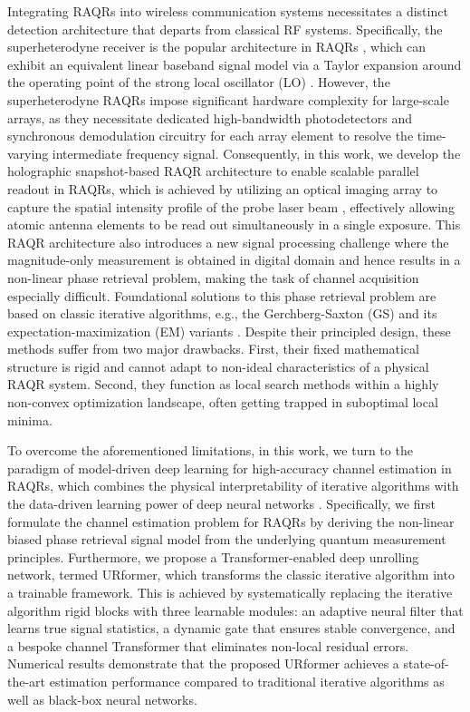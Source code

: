 \documentclass[journal]{IEEEtran}
\begin{document}
Integrating RAQRs into wireless communication systems necessitates a distinct detection architecture that departs from classical RF systems. Specifically, the superheterodyne receiver is the popular architecture in RAQRs \cite{jing2020atomic}, which can exhibit an equivalent linear baseband signal model via a Taylor expansion around the operating point of the strong local oscillator (LO) \cite{b4, 11161431}. However, the superheterodyne RAQRs impose significant hardware complexity for large-scale arrays, as they necessitate dedicated high-bandwidth photodetectors and synchronous demodulation circuitry for each array element to resolve the time-varying intermediate frequency signal. Consequently, in this work, we develop the holographic snapshot-based RAQR architecture to enable scalable parallel readout in RAQRs, which is achieved by utilizing an optical imaging array to capture the spatial intensity profile of the probe laser beam \cite{fan2014subwavelength}, effectively allowing atomic antenna elements to be read out simultaneously in a single exposure. This RAQR architecture also introduces a new signal processing challenge where the magnitude-only measurement is obtained in digital domain and hence results in a non-linear phase retrieval problem, making the task of channel acquisition especially difficult. Foundational solutions to this phase retrieval problem are based on classic iterative algorithms, e.g., the Gerchberg-Saxton (GS) and its expectation-maximization (EM) variants \cite{b2}. Despite their principled design, these methods suffer from two major drawbacks. First, their fixed mathematical structure is rigid and cannot adapt to non-ideal characteristics of a physical RAQR system. Second, they function as local search methods within a highly non-convex optimization landscape, often getting trapped in suboptimal local minima.

To overcome the aforementioned limitations, in this work, we turn to the paradigm of model-driven deep learning for high-accuracy channel estimation in RAQRs, which combines the physical interpretability of iterative algorithms with the data-driven learning power of deep neural networks \cite{9524496}. Specifically, we first formulate the channel estimation problem for RAQRs by deriving the non-linear biased phase retrieval signal model from the underlying quantum measurement principles. Furthermore, we propose a Transformer-enabled deep unrolling network, termed URformer, which transforms the classic iterative algorithm into a trainable framework. This is achieved by systematically replacing the iterative algorithm rigid blocks with three learnable modules: an adaptive neural filter that learns true signal statistics, a dynamic gate that ensures stable convergence, and a bespoke channel Transformer that eliminates non-local residual errors. Numerical results demonstrate that the proposed URformer achieves a state-of-the-art estimation performance compared to traditional iterative algorithms as well as black-box neural networks.
\end{document}
